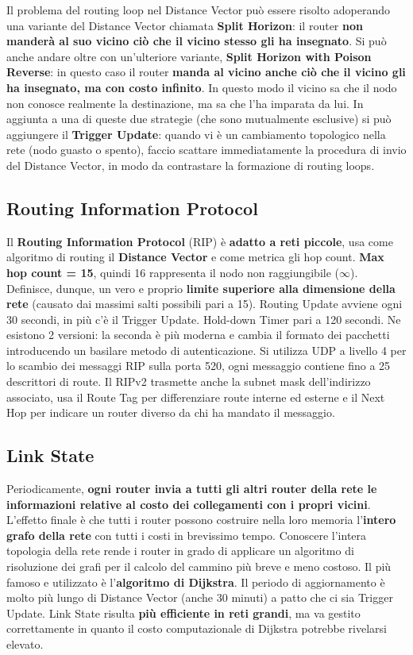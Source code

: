 \documentclass[12pt]{article}
\begin{document}
Il problema del routing loop nel Distance Vector può essere risolto adoperando una variante del Distance Vector chiamata \textbf{Split Horizon}: il router \textbf{non manderà al suo vicino ciò che il vicino stesso gli ha insegnato}. Si può anche andare oltre con un'ulteriore variante, \textbf{Split Horizon with Poison Reverse}: in questo caso il router \textbf{manda al vicino anche ciò che il vicino gli ha insegnato, ma con costo infinito}. In questo modo il vicino sa che il nodo non conosce realmente la destinazione, ma sa che l'ha imparata da lui. In aggiunta a una di queste due strategie (che sono mutualmente esclusive) si può aggiungere il \textbf{Trigger Update}: quando vi è un cambiamento topologico nella rete (nodo guasto o spento), faccio scattare immediatamente la procedura di invio del Distance Vector, in modo da contrastare la formazione di routing loops.

\subsection{Routing Information Protocol}

Il \textbf{Routing Information Protocol} (RIP) è \textbf{adatto a reti piccole}, usa come algoritmo di routing il \textbf{Distance Vector} e come metrica gli hop count. \textbf{Max hop count = 15}, quindi 16 rappresenta il nodo non raggiungibile ($\infty$). Definisce, dunque, un vero e proprio \textbf{limite superiore alla dimensione della rete} (causato dai massimi salti possibili pari a 15). Routing Update avviene ogni 30 secondi, in più c'è il Trigger Update. Hold-down Timer pari a 120 secondi. Ne esistono 2 versioni: la seconda è più moderna e cambia il formato dei pacchetti introducendo un basilare metodo di autenticazione. Si utilizza UDP a livello 4 per lo scambio dei messaggi RIP sulla porta 520, ogni messaggio contiene fino a 25 descrittori di route. Il RIPv2 trasmette anche la subnet mask dell'indirizzo associato, usa il Route Tag per differenziare route interne ed esterne e il Next Hop per indicare un router diverso da chi ha mandato il messaggio.

\subsection{Link State}

Periodicamente, \textbf{ogni router invia a tutti gli altri router della rete le informazioni relative al costo dei collegamenti con i propri vicini}. L'effetto finale è che tutti i router possono costruire nella loro memoria l'\textbf{intero grafo della rete} con tutti i costi in brevissimo tempo. Conoscere l'intera topologia della rete rende i router in grado di applicare un algoritmo di risoluzione dei grafi per il calcolo del cammino più breve e meno costoso. Il più famoso e utilizzato è l'\textbf{algoritmo di Dijkstra}. Il periodo di aggiornamento è molto più lungo di Distance Vector (anche 30 minuti) a patto che ci sia Trigger Update. Link State risulta \textbf{più efficiente in reti grandi}, ma va gestito correttamente in quanto il costo computazionale di Dijkstra potrebbe rivelarsi elevato.
\end{document}
